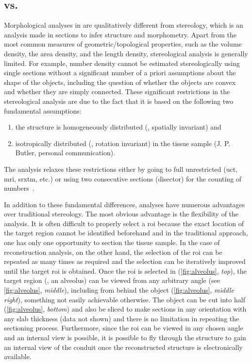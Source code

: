 \subsection{\twod vs. \threed}
Morphological analyses in \threed are qualitatively different from stereology, which is an analysis made in \twod sections to infer \threed structure and morphometry. Apart from the most common measures of geometric/topological properties, such as the volume density, the area density, and the length density, stereological analysis is generally limited. For example, number density cannot be estimated stereologically using single sections without a significant number of a priori assumptions about the shape of the objects, including the question of whether the objects are convex and whether they are simply connected. These significant restrictions in the stereological analysis are due to the fact that it is based on the following two fundamental assumptions: 
\begin{enumerate}
	\item the structure is homogeneously distributed (\ie, spatially invariant) and 
	\item isotropically distributed (\ie, rotation invariant) in the tissue sample (J. P. Butler, personal communication). 
\end{enumerate}
The \threed analysis relaxes these restrictions either by going to full unrestricted \threed (\ac{uct}, \ac{mri}, \ac{srxtm}, etc.) or using two consecutive sections (disector) for the counting of numbers~\cite{Hyde2007}.

In addition to these fundamental differences, \threed analyses have numerous advantages over traditional stereology. The most obvious advantage is the flexibility of the analysis. It is often difficult to properly select a \ac{roi} because the exact location of the target region cannot be identified beforehand and in the traditional approach, one has only one opportunity to section the tissue sample. In the case of \threed reconstruction analysis, on the other hand, the selection of the \ac{roi} can be repeated as many times as required and the selection can be iteratively improved until the target \ac{roi} is obtained. Once the \ac{roi} is selected in \threed (\autoref{fig:alveolus}, \emph{top}), the target region (\eg, an alveolus) can be viewed from any arbitrary angle (see \autoref{fig:alveolus}, \emph{middle}), including from behind the object (\autoref{fig:alveolus}, \emph{middle right}), something not easily achievable otherwise. The \threed object can be cut into half (\autoref{fig:alveolus}, \emph{bottom}) and also be sliced to make \twod sections in any orientation with any slab thickness (data not shown) and there is no limitation in repeating the sectioning process. Furthermore, since the \ac{roi} can be viewed in any chosen angle and an internal view is possible, it is possible to fly through the structure to gain an internal view of the conduit once the \threed reconstructed structure is electronically available.

